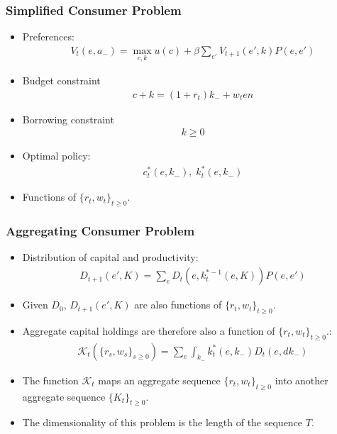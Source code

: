\documentclass[english,xcolor=svgnames]{beamer}
\begin{document}
\begin{frame}
    \frametitle{Simplified Consumer Problem}
    \begin{itemize}
        \item Preferences:
        \begin{align*}
        	V_t(e,a_{-}) = \max_{c,k} u(c) + \beta \sum_{e'} V_{t+1}(e',k)P(e,e')
        \end{align*}
        \item Budget constraint
        \begin{align*}
        	c+k = (1+r_t)k_{-}+w_t e n
        \end{align*}
        \item Borrowing constraint
        \begin{align*}
        	k \ge 0
        \end{align*}
        \item Optimal policy:
        \begin{align*}
        	c_t^*(e,k_{-}),\; k_t^*(e,k_{-})
        \end{align*}
        \item Functions of $\{r_t,w_t\}_{t\ge 0 }$.
	\end{itemize}
\end{frame}

\begin{frame}
    \frametitle{Aggregating Consumer Problem}
    \begin{itemize}
        \item Distribution of capital and productivity:
        \begin{align*}
        	D_{t+1}(e',K) = \sum_e D_t(e,k_t^{*-1}(e,K))P(e,e')
        \end{align*}
        \item Given $D_0$, $D_{t+1}(e',K)$ are also functions of $\{r_t,w_t\}_{t\ge 0 }$.
        \item Aggregate capital holdings are therefore also a function of $\{r_t,w_t\}_{t\ge 0 }$.:
        \begin{align*}
        	\mathcal{K}_t(\{r_s,w_s\}_{s\ge 0 }) = \sum_e \int_{k_{-}} k_t^*(e,k_{-}) D_t(e,dk_{-})
        \end{align*}
        \item The function $\mathcal{K}_t$ maps an aggregate sequence $\{r_t,w_t\}_{t\ge 0 }$ into another aggregate sequence $\{K_t\}_{t\ge 0}$.
        \item The dimensionality of this problem is the length of the sequence $T$.
	\end{itemize}
\end{frame}
\end{document}
